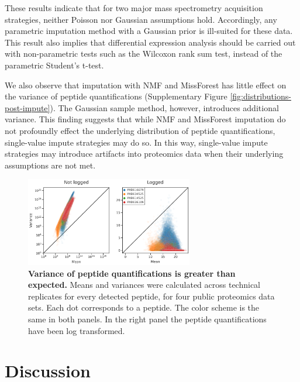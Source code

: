 \documentclass{article}
\begin{document}
These results indicate that for two major mass spectrometry acquisition strategies, neither Poisson nor Gaussian assumptions hold. Accordingly, any parametric imputation method with a Gaussian prior is ill-suited for these data. This result also implies that differential expression analysis should be carried out with non-parametric tests such as the Wilcoxon rank sum test, instead of the parametric Student's t-test. 

We also observe that imputation with NMF and MissForest has little effect on the variance of peptide quantifications (Supplementary Figure \ref{fig:distributions-post-impute}). The Gaussian sample method, however, introduces additional variance. This finding suggests that while NMF and MissForest imputation do not profoundly effect the underlying distribution of peptide quantifications, single-value impute strategies may do so. In this way, single-value impute strategies may introduce artifacts into proteomics data when their underlying assumptions are not met.


\begin{figure}
  \centering
  \includegraphics[width=0.65\textwidth]{figures/mean-x-var-figure-v3.png}
  \caption{{\bf Variance of peptide quantifications is greater than expected.} Means and variances were calculated across technical replicates for every detected peptide, for four public proteomics data sets. Each dot corresponds to a peptide. The color scheme is the same in both panels. In the right panel the peptide quantifications have been log transformed.}
  \label{fig:mean-x-var}
\end{figure} 

\section{Discussion}
\end{document}
